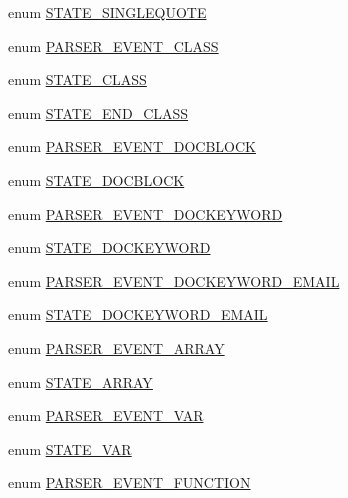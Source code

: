 \begin{DoxyCompactItemize}
\item 
enum \hyperlink{_parser_8inc_afbf0444de83d08ee182eb035ea5c6073}{\-S\-T\-A\-T\-E\-\_\-\-S\-I\-N\-G\-L\-E\-Q\-U\-O\-T\-E} 
\item 
enum \hyperlink{_parser_8inc_acc95fa6cc3960e449616c84aa164d2ab}{\-P\-A\-R\-S\-E\-R\-\_\-\-E\-V\-E\-N\-T\-\_\-\-C\-L\-A\-S\-S} 
\item 
enum \hyperlink{_parser_8inc_a6c11979376724f4ef3dde528af04cb05}{\-S\-T\-A\-T\-E\-\_\-\-C\-L\-A\-S\-S} 
\item 
enum \hyperlink{_parser_8inc_a2b19a1f2786c4d39b4e350fea2302db2}{\-S\-T\-A\-T\-E\-\_\-\-E\-N\-D\-\_\-\-C\-L\-A\-S\-S} 
\item 
enum \hyperlink{_parser_8inc_a15fa2acbc81017e3384a21d96aecd42c}{\-P\-A\-R\-S\-E\-R\-\_\-\-E\-V\-E\-N\-T\-\_\-\-D\-O\-C\-B\-L\-O\-C\-K} 
\item 
enum \hyperlink{_parser_8inc_afdfa511d6fc249ba86aa216881e00ee2}{\-S\-T\-A\-T\-E\-\_\-\-D\-O\-C\-B\-L\-O\-C\-K} 
\item 
enum \hyperlink{_parser_8inc_acb8068b1b361643345e698c9063fc13f}{\-P\-A\-R\-S\-E\-R\-\_\-\-E\-V\-E\-N\-T\-\_\-\-D\-O\-C\-K\-E\-Y\-W\-O\-R\-D} 
\item 
enum \hyperlink{_parser_8inc_a25792634000549efa34ae154864df04d}{\-S\-T\-A\-T\-E\-\_\-\-D\-O\-C\-K\-E\-Y\-W\-O\-R\-D} 
\item 
enum \hyperlink{_parser_8inc_a460665440ffad69c42366e618e319206}{\-P\-A\-R\-S\-E\-R\-\_\-\-E\-V\-E\-N\-T\-\_\-\-D\-O\-C\-K\-E\-Y\-W\-O\-R\-D\-\_\-\-E\-M\-A\-I\-L} 
\item 
enum \hyperlink{_parser_8inc_a3319b7e7e64cf25fd17bfdce57578737}{\-S\-T\-A\-T\-E\-\_\-\-D\-O\-C\-K\-E\-Y\-W\-O\-R\-D\-\_\-\-E\-M\-A\-I\-L} 
\item 
enum \hyperlink{_parser_8inc_a2b086ce27e28124312c60d77a2825bb1}{\-P\-A\-R\-S\-E\-R\-\_\-\-E\-V\-E\-N\-T\-\_\-\-A\-R\-R\-A\-Y} 
\item 
enum \hyperlink{_parser_8inc_a4523af23d05c20ad5f2e8a3752bab5e3}{\-S\-T\-A\-T\-E\-\_\-\-A\-R\-R\-A\-Y} 
\item 
enum \hyperlink{_parser_8inc_a0c4073efbdf0a1f8a165e6a594be71ba}{\-P\-A\-R\-S\-E\-R\-\_\-\-E\-V\-E\-N\-T\-\_\-\-V\-A\-R} 
\item 
enum \hyperlink{_parser_8inc_a5fdc9432512b0a0d264f248273fde458}{\-S\-T\-A\-T\-E\-\_\-\-V\-A\-R} 
\item 
enum \hyperlink{_parser_8inc_a5d50e7cf32d77f0e582e8df4a61e4576}{\-P\-A\-R\-S\-E\-R\-\_\-\-E\-V\-E\-N\-T\-\_\-\-F\-U\-N\-C\-T\-I\-O\-N} 
\item 

\end{DoxyCompactItemize}
